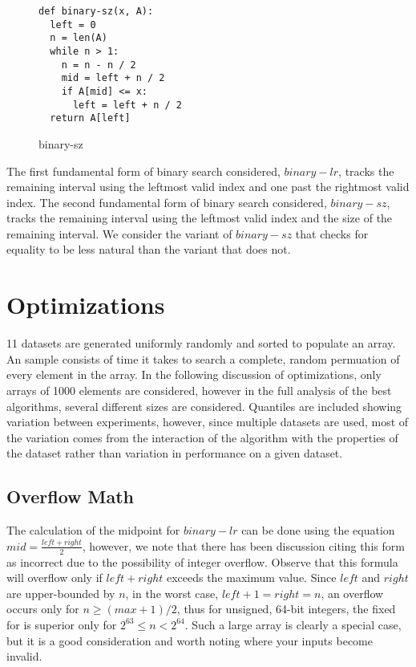 \documentclass{article}
\begin{document}
\begin{figure}[h]
\begin{verbatim}
def binary-sz(x, A):
  left = 0
  n = len(A)
  while n > 1:
    n = n - n / 2
    mid = left + n / 2 
    if A[mid] <= x:
      left = left + n / 2
  return A[left]
\end{verbatim}
\caption{binary-sz}
\end{figure}

The first fundamental form of binary search considered, $binary-lr$, tracks the
remaining interval using the leftmost valid index and one past the rightmost
valid index. The second fundamental form of binary search considered,
$binary-sz$, tracks the remaining interval using the leftmost valid index and
the size of the remaining interval. We consider the variant of $binary-sz$ that
checks for equality to be less natural than the variant that does not.

\section{Optimizations}

11 datasets are generated uniformly randomly and sorted to populate an array. An sample consists of time it takes to search a complete, random permuation of every element in the array. In the following discussion of optimizations, only arrays of 1000 elements are considered, however in the full analysis of the best algorithms, several different sizes are considered. Quantiles are included showing variation between experiments, however, since multiple datasets are used, most of the variation comes from the interaction of the algorithm with the properties of the dataset rather than variation in performance on a given dataset.

\subsection{Overflow Math}
The calculation of the midpoint for $binary-lr$ can be done using the equation
$mid = \frac{left+right}{2}$, however, we note that there has been discussion
citing this form as incorrect due to the possibility of integer overflow.
Observe that this formula will overflow only if $left + right$ exceeds the
maximum value. Since $left$ and $right$ are upper-bounded by $n$, in the worst case, $left + 1 = right = n$, an overflow occurs only for $n \geq (max + 1) / 2$, thus for unsigned, 64-bit integers, the fixed for is superior only for $2^{63} \leq n < 2^{64}$. Such a large array is clearly a special case, but it is a good consideration and worth noting where your inputs become invalid.
\end{document}
